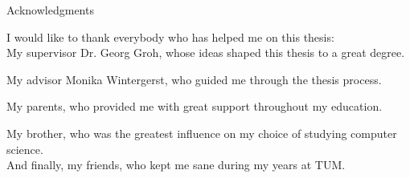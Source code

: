 \thispagestyle{empty}

\vspace*{20mm}

\begin{center}
{ Acknowledgments}
\end{center}

\vspace{10mm} 
I would like to thank everybody who has helped me on this thesis:\\

My supervisor Dr. Georg Groh, whose ideas shaped this thesis to a great degree.

My advisor Monika Wintergerst, who guided me through the thesis process.

My parents, who provided me with great support throughout my education.

My brother, who was the greatest influence on my choice of studying computer science.\\

And finally, my friends, who kept me sane during my years at TUM.
\cleardoublepage{}
